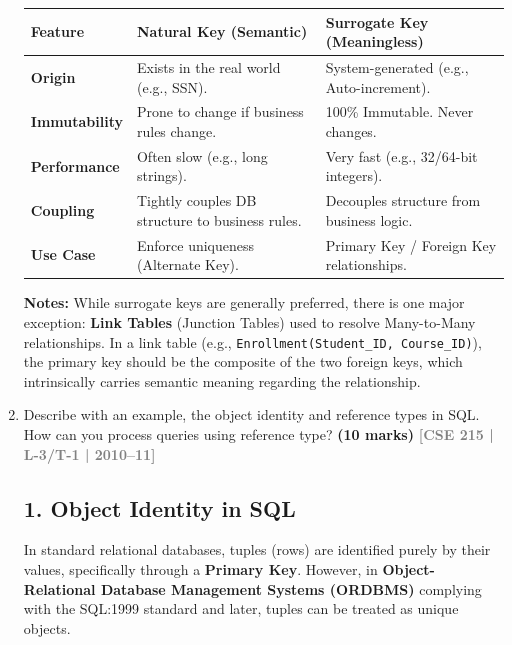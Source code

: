 \documentclass[12pt,a3paper]{article}
\newcommand{\yr}[1]{\hfill\textcolor{gray}{\small\textbf{[#1]}}}
\newcommand{\mk}[1]{\textcolor{orange!70!black}{\small\textbf{(#1 marks)}}}
\begin{document}
\begin{enumerate}
\begin{tcolorbox}[enhanced,breakable,ansbox,colback=cA!4,colframe=cA,boxrule=0.8pt,arc=5pt,title={\textbf{Answer}},fonttitle=\bfseries\color{white},colbacktitle=cA]
\begin{center}
\renewcommand{\arraystretch}{1.4}
\begin{tabular}{@{} p{3.5cm} p{5.5cm} p{5.5cm} @{}}
\toprule
\textbf{Feature} & \textbf{Natural Key (Semantic)} & \textbf{Surrogate Key (Meaningless)} \\
\midrule
\textbf{Origin} & Exists in the real world (e.g., SSN). & System-generated (e.g., Auto-increment). \\
\textbf{Immutability} & Prone to change if business rules change. & 100\% Immutable. Never changes. \\
\textbf{Performance} & Often slow (e.g., long strings). & Very fast (e.g., 32/64-bit integers). \\
\textbf{Coupling} & Tightly couples DB structure to business rules. & Decouples structure from business logic. \\
\textbf{Use Case} & Enforce uniqueness (Alternate Key). & Primary Key / Foreign Key relationships. \\
\bottomrule
\end{tabular}
\end{center}

\vspace{1em}
\noindent\textbf{Notes:} While surrogate keys are generally preferred, there is one major exception: \textbf{Link Tables} (Junction Tables) used to resolve Many-to-Many relationships. In a link table (e.g., \texttt{Enrollment(Student\_ID, Course\_ID)}), the primary key should be the composite of the two foreign keys, which intrinsically carries semantic meaning regarding the relationship.

\end{tcolorbox}

\item Describe with an example, the object identity and reference types in SQL. How can you process queries using reference type?
\mk{10} \yr{CSE 215 | L-3/T-1 | 2010--11}

\begin{tcolorbox}[enhanced,breakable,ansbox,colback=cA!4,colframe=cA,boxrule=0.8pt,arc=5pt,title={\textbf{Answer}},fonttitle=\bfseries\color{white},colbacktitle=cA]

\subsection*{1. Object Identity in SQL}

In standard relational databases, tuples (rows) are identified purely by their values, specifically through a \textbf{Primary Key}. However, in \textbf{Object-Relational Database Management Systems (ORDBMS)} complying with the SQL:1999 standard and later, tuples can be treated as unique objects.


\end{tcolorbox}
\end{enumerate}
\end{document}
